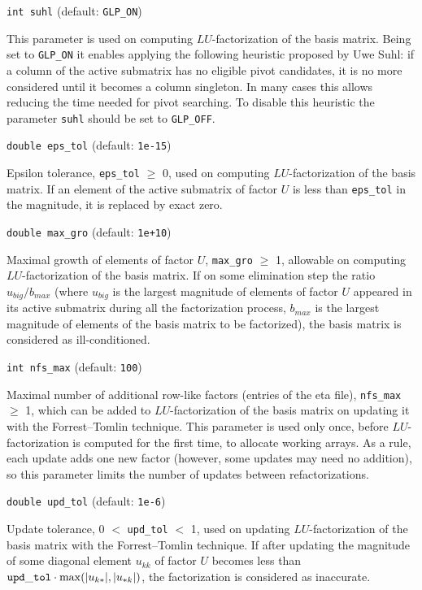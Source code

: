 {\tt int suhl} (default: {\tt GLP\_ON})

This parameter is used on computing $LU$-factorization of the basis
matrix. Being set to {\tt GLP\_ON} it enables applying the following
heuristic proposed by Uwe Suhl: if a column of the active submatrix has
no eligible pivot candidates, it is no more considered until it becomes
a column singleton. In many cases this allows reducing the time needed
for pivot searching. To disable this heuristic the parameter
\verb|suhl| should be set to {\tt GLP\_OFF}.

\medskip

{\tt double eps\_tol} (default: {\tt 1e-15})

Epsilon tolerance, \verb|eps_tol| $\geq$ 0, used on computing
$LU$-factorization of the basis matrix. If an element of the active
submatrix of factor $U$ is less than \verb|eps_tol| in the magnitude,
it is replaced by exact zero.

\medskip

{\tt double max\_gro} (default: {\tt 1e+10})

Maximal growth of elements of factor $U$, \verb|max_gro| $\geq$ 1,
allowable on computing $LU$-factorization of the basis matrix. If on
some elimination step the ratio $u_{big}/b_{max}$ (where $u_{big}$ is
the largest magnitude of elements of factor $U$ appeared in its active
submatrix during all the factorization process, $b_{max}$ is the
largest magnitude of elements of the basis matrix to be factorized),
the basis matrix is considered as ill-conditioned.

\medskip

{\tt int nfs\_max} (default: {\tt 100})

Maximal number of additional row-like factors (entries of the eta
file), \verb|nfs_max| $\geq$ 1, which can be added to
$LU$-factorization of the basis matrix on updating it with the
Forrest--Tomlin technique. This parameter is used only once, before
$LU$-factorization is computed for the first time, to allocate working
arrays. As a rule, each update adds one new factor (however, some
updates may need no addition), so this parameter limits the number of
updates between refactorizations.

\medskip

{\tt double upd\_tol} (default: {\tt 1e-6})

Update tolerance, 0 $<$ \verb|upd_tol| $<$ 1, used on updating
$LU$-factorization of the basis matrix with the Forrest--Tomlin
technique. If after updating the magnitude of some diagonal element
$u_{kk}$ of factor $U$ becomes less than
${\tt upd\_tol}\cdot\max(|u_{k*}|, |u_{*k}|)$, the factorization is
considered as inaccurate.

